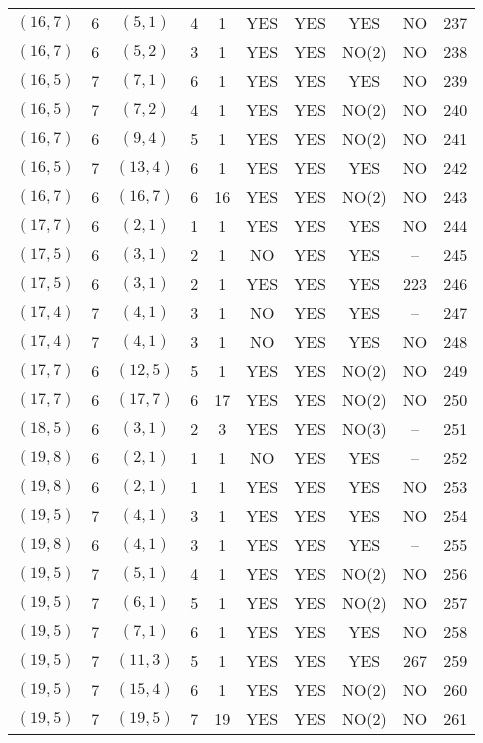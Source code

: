 \begin{longtable}{|c|c|c|c|c|c|c|c|c|c|}
$(16, 7)$ & 6 & $(5, 1)$ & 4 & 1 & YES & YES & YES & NO & 237\\
$(16, 7)$ & 6 & $(5, 2)$ & 3 & 1 & YES & YES & NO(2) & NO & 238\\
$(16, 5)$ & 7 & $(7, 1)$ & 6 & 1 & YES & YES & YES & NO & 239\\
$(16, 5)$ & 7 & $(7, 2)$ & 4 & 1 & YES & YES & NO(2) & NO & 240\\
$(16, 7)$ & 6 & $(9, 4)$ & 5 & 1 & YES & YES & NO(2) & NO & 241\\
$(16, 5)$ & 7 & $(13, 4)$ & 6 & 1 & YES & YES & YES & NO & 242\\
$(16, 7)$ & 6 & $(16, 7)$ & 6 & 16 & YES & YES & NO(2) & NO & 243\\
$(17, 7)$ & 6 & $(2, 1)$ & 1 & 1 & YES & YES & YES & NO & 244\\
$(17, 5)$ & 6 & $(3, 1)$ & 2 & 1 & NO & YES & YES & -- & 245\\
$(17, 5)$ & 6 & $(3, 1)$ & 2 & 1 & YES & YES & YES & 223 & 246\\
$(17, 4)$ & 7 & $(4, 1)$ & 3 & 1 & NO & YES & YES & -- & 247\\
$(17, 4)$ & 7 & $(4, 1)$ & 3 & 1 & NO & YES & YES & NO & 248\\
$(17, 7)$ & 6 & $(12, 5)$ & 5 & 1 & YES & YES & NO(2) & NO & 249\\
$(17, 7)$ & 6 & $(17, 7)$ & 6 & 17 & YES & YES & NO(2) & NO & 250\\
$(18, 5)$ & 6 & $(3, 1)$ & 2 & 3 & YES & YES & NO(3) & -- & 251\\
$(19, 8)$ & 6 & $(2, 1)$ & 1 & 1 & NO & YES & YES & -- & 252\\
$(19, 8)$ & 6 & $(2, 1)$ & 1 & 1 & YES & YES & YES & NO & 253\\
$(19, 5)$ & 7 & $(4, 1)$ & 3 & 1 & YES & YES & YES & NO & 254\\
$(19, 8)$ & 6 & $(4, 1)$ & 3 & 1 & YES & YES & YES & -- & 255\\
$(19, 5)$ & 7 & $(5, 1)$ & 4 & 1 & YES & YES & NO(2) & NO & 256\\
$(19, 5)$ & 7 & $(6, 1)$ & 5 & 1 & YES & YES & NO(2) & NO & 257\\
$(19, 5)$ & 7 & $(7, 1)$ & 6 & 1 & YES & YES & YES & NO & 258\\
$(19, 5)$ & 7 & $(11, 3)$ & 5 & 1 & YES & YES & YES & 267 & 259\\
$(19, 5)$ & 7 & $(15, 4)$ & 6 & 1 & YES & YES & NO(2) & NO & 260\\
$(19, 5)$ & 7 & $(19, 5)$ & 7 & 19 & YES & YES & NO(2) & NO & 261\\

\end{longtable}
